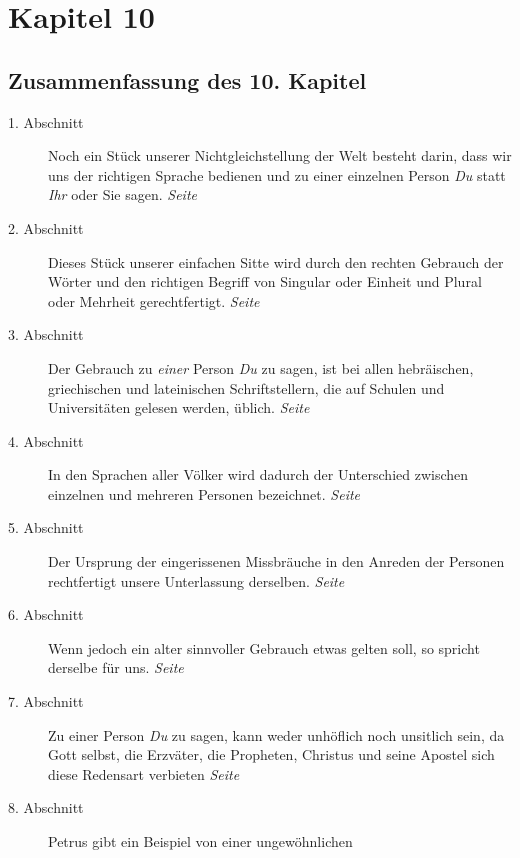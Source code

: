 
\chapter{Kapitel 10} \label{kap10}
\section{Zusammenfassung des 10. Kapitel}


\begin{description}
\item[1. Abschnitt] Noch ein Stück unserer Nichtgleichstellung der Welt besteht
darin, dass wir uns der richtigen Sprache bedienen und zu einer einzelnen Person
\textit{Du} statt \textit{Ihr} oder Sie sagen.
\dotfill \textit{Seite~\pageref{kap10_ab1}}\\
\item[2. Abschnitt] Dieses Stück unserer einfachen Sitte wird durch den rechten
Gebrauch der Wörter und den richtigen Begriff von Singular oder Einheit und
Plural oder Mehrheit gerechtfertigt.
\dotfill \textit{Seite~\pageref{kap10_ab2}}\\
\item[3. Abschnitt] Der Gebrauch zu \textit{einer} Person \textit{Du} zu sagen,
ist bei
allen hebräischen, griechischen und lateinischen Schriftstellern, die auf
Schulen und Universitäten gelesen werden, üblich.
\dotfill \textit{Seite~\pageref{kap10_ab3}}\\
\item[4. Abschnitt] In den Sprachen aller Völker wird dadurch der Unterschied
zwischen einzelnen und mehreren Personen bezeichnet.
\dotfill \textit{Seite~\pageref{kap10_ab4}}\\
\item[5. Abschnitt] Der Ursprung der eingerissenen Missbräuche in den Anreden
der
Personen rechtfertigt unsere Unterlassung derselben.
\dotfill \textit{Seite~\pageref{kap10_ab5}}\\
\item[6. Abschnitt] Wenn jedoch ein alter sinnvoller Gebrauch etwas gelten
soll, so spricht derselbe für uns.
\dotfill \textit{Seite~\pageref{kap10_ab6}}\\
\item[7. Abschnitt] Zu einer Person \textit{Du} zu sagen, kann weder unhöflich
noch
unsitlich sein, da Gott selbst, die Erzväter, die Propheten, Christus und
seine Apostel sich diese Redensart verbieten
\dotfill \textit{Seite~\pageref{kap10_ab7}}\\
\item[8. Abschnitt] Petrus gibt ein Beispiel von einer ungewöhnlichen

\end{description}

